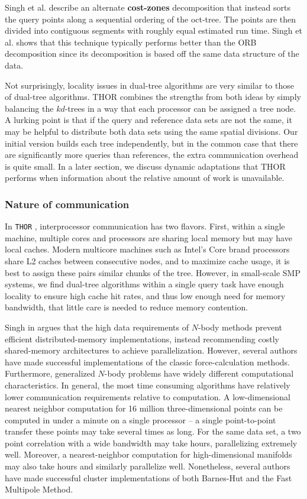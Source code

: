 \documentclass[twoside,leqno,twocolumn]{article}
\newcommand{\THOR}{{{\tt THOR}} }
\newcommand{\mysubsub}[1]{\subsubsection{#1} }
\newcommand{\defterm}[1]{{\bf #1}}
\begin{document}
Singh et al. describe an alternate \defterm{cost-zones} decomposition\cite{singh95load} that instead sorts the query points along a sequential ordering of the oct-tree.
The points are then divided into contiguous segments with roughly equal estimated run time.
Singh et al. shows\cite{singh95load} that this technique typically performs better than the ORB decomposition since its decomposition is based off the same data structure of the data.

Not surprisingly, locality issues in dual-tree algorithms are very similar to those of dual-tree algorithms.
THOR combines the strengths from both ideas by simply balancing the $kd$-trees in a way that each processor can be assigned a tree node.
A lurking point is that if the query and reference data sets are not the same, it may be helpful to distribute both data sets using the same spatial divisions.
Our initial version builds each tree independently, but in the common case that there are significantly more queries than references, the extra communication overhead is quite small.
In a later section, we discuss dynamic adaptations that THOR performs when information about the relative amount of work is unavailable.

\mysubsub{Nature of communication}

In \THOR, interprocessor communication has two flavors.
First, within a single machine, multiple cores and processors are sharing local memory but may have local caches.
Modern multicore machines such as Intel's Core brand processors share L2 caches between consecutive nodes, and to maximize cache usage, it is best to assign these pairs similar chunks of the tree.
However, in small-scale SMP systems, we find dual-tree algorithms within a single query task have enough locality to ensure high cache hit rates, and thus low enough need for memory bandwidth, that little care is needed to reduce memory contention.

Singh in \cite{singh_thesis} argues that the high data requirements of $N$-body methods prevent efficient distributed-memory implementations, instead recommending costly shared-memory architectures to achieve parallelization.
However, several authors \cite{salmon_thesis, liu94experiences, salmon97parallel} have made successful implementations of the classic force-calculation methods.
Furthermore, generalized $N$-body problems have widely different computational characteristics.
In general, the most time consuming algorithms have relatively lower communication requirements relative to computation.
A low-dimensional nearest neighbor computation for 16 million three-dimensional points can be computed in under a minute on a single processor -- a single point-to-point transfer these points may take several times as long.
For the same data set, a two point correlation with a wide bandwidth may take hours, parallelizing extremely well.
Moreover, a nearest-neighbor computation for high-dimensional manifolds may also take hours and similarly parallelize well.
Nonetheless, several authors have made successful cluster implementations of both Barnes-Hut and the Fast Multipole Method.
\end{document}

